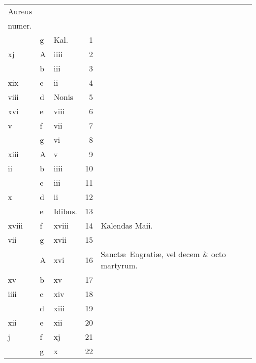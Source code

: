 \documentclass[openany]{book}
\begin{document}
\begin{center}
\begin{tabular}{l | l | l | r | l r}
\color{Red}Aureus & & & & \color{Red} \\
\color{Red}numer. & & & & \color{Red} \\
\color{Red}  & g & \color{Red} Kal. & 1 & & \color{Red} \\
\color{Red} xj & \color{Red} A & \color{Red} iiii & 2 & & \color{Red} \\
\color{Red}  & b & \color{Red} iii & 3 & & \color{Red} \\
\color{Red} xix & c & \color{Red} ii & 4 & & \color{Red} \\
\color{Red} viii & d & Nonis & 5 & & \color{Red} \\
\color{Red} xvi & e & \color{Red} viii & 6 & & \color{Red} \\
\color{Red} v & f & \color{Red} vii & 7 & & \color{Red} \\
\color{Red}  & g & \color{Red} vi & 8 & & \color{Red} \\
\color{Red} xiii & \color{Red} A & \color{Red} v & 9 & & \color{Red} \\
\color{Red} ii & b & \color{Red} iiii & 10 & & \color{Red} \\
\color{Red}  & c & \color{Red} iii & 11 & & \color{Red} \\
\color{Red} x & d & \color{Red} ii & 12 & & \color{Red} \\
\color{Red}  & e & Idibus. & 13 & & \color{Red} \\
\color{Red} xviii & f & \color{Red} xviii & 14 & \qquad \color{Red} Kalendas Maii. & \color{Red} \\
\color{Red} vii & g & \color{Red} xvii & 15 & & \color{Red} \\
\color{Red}  & \color{Red} A & \color{Red} xvi & 16 & Sanct\ae \ Engrati\ae , vel decem \& octo martyrum. & \color{Red} \\
\color{Red} xv & b & \color{Red} xv & 17 & & \color{Red} \\
\color{Red} iiii & c & \color{Red} xiv & 18 & & \color{Red} \\
\color{Red}  & d & \color{Red} xiii & 19 & & \color{Red} \\
\color{Red} xii & e & \color{Red} xii & 20 & & \color{Red} \\
\color{Red} j & f & \color{Red} xj & 21 & & \color{Red} \\
\color{Red}  & g & \color{Red} x & 22 & & \color{Red} \\

\end{tabular}
\end{center}
\end{document}
